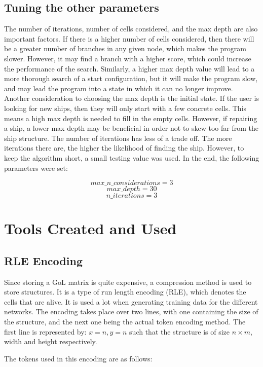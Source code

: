 \documentclass{l4proj}
\begin{document}
\subsection{Tuning the other parameters}

The number of iterations, number of cells considered, and the max depth are also important factors. If there is a higher number of cells considered, then there will be a greater number of branches in any given node, which makes the program slower. However, it may find a branch with a higher score, which could increase the performance of the search. Similarly, a higher max depth value will lead to a more thorough search of a start configuration, but it will make the program slow, and may lead the program into a state in which it can no longer improve. Another consideration to choosing the max depth is the initial state. If the user is looking for new ships, then they will only start with a few concrete cells. This means a high max depth is needed to fill in the empty cells. However, if repairing a ship, a lower max depth may be beneficial in order not to skew too far from the ship structure. The number of iterations has less of a trade off. The more iterations there are, the higher the likelihood of finding the ship. However, to keep the algorithm short, a small testing value was used. In the end, the following parameters were set:

\[ max\_n\_considerations = 3\]
\[ max\_depth = 30\]
\[ n\_iterations = 3\]


\section{Tools Created and Used}

\subsection{RLE Encoding}

Since storing a GoL matrix is quite expensive, a compression method is used to store structures. It is a type of run length encoding (RLE), which denotes the cells that are alive. It is used a lot when generating training data for the different networks. The encoding takes place over two lines, with one containing the size of the structure, and the next one being the actual token encoding method. The first line is represented by: $x = n, y = n $ such that the structure is of size $n \times m$, width and height respectively.

The tokens used in this encoding are as follows:
\end{document}
